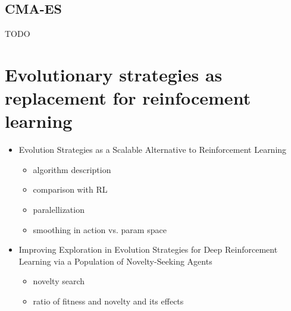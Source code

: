 \subsection{CMA-ES}
\label{subsec:cma-es}
TODO \cite{Hansen06}
\section{Evolutionary strategies as replacement for reinfocement learning}
\label{sec:es-reinf}
\begin{itemize}
    \item Evolution Strategies as a Scalable Alternative to Reinforcement Learning \cite{salimans2017} \begin{itemize}
        \item algorithm description
        \item comparison with RL
        \item paralellization
        \item smoothing in action vs. param space
    \end{itemize}
    \item Improving Exploration in Evolution Strategies for Deep Reinforcement Learning via a Population of Novelty-Seeking Agents \cite{conti2018} \begin{itemize}
        \item novelty search
        \item ratio of fitness and novelty and its effects
    \end{itemize}
\end{itemize}